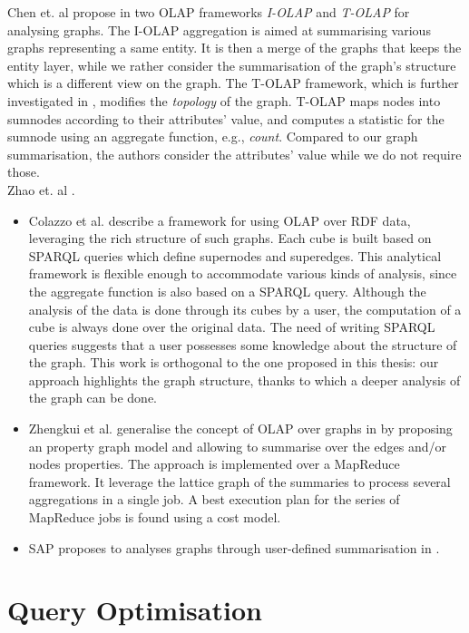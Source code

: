 Chen et. al propose in \cite{chen:icdm:2008} two OLAP frameworks \emph{I-OLAP} and \emph{T-OLAP} for analysing graphs. The I-OLAP aggregation is aimed at summarising various graphs representing a same entity. It is then a merge of the graphs that keeps the entity layer, while we rather consider the summarisation of the graph's structure which is a different view on the graph. The T-OLAP framework, which is further investigated in \cite{qu:dasfaa:2011}, modifies the \emph{topology} of the graph. T-OLAP maps nodes into sumnodes according to their attributes' value, and computes a statistic for the sumnode using an aggregate function, e.g., \emph{count}. Compared to our graph summarisation, the authors consider the attributes' value while we do not require those.\\

Zhao et. al \cite{zhao:sigmod:2011}.

\begin{itemize}
\item Colazzo et al. \cite{colazzo:www:2014} describe a framework for using OLAP over RDF data, leveraging the rich structure of such graphs. Each cube is built based on SPARQL queries which define supernodes and superedges. This analytical framework is flexible enough to accommodate various kinds of analysis, since the aggregate function is also based on a SPARQL query. Although the analysis of the data is done through its cubes by a user, the computation of a cube is always done over the original data. The need of writing SPARQL queries suggests that a user possesses some knowledge about the structure of the graph. This work is orthogonal to the one proposed in this thesis: our approach highlights the graph structure, thanks to which a deeper analysis of the graph can be done.
\item Zhengkui et al. generalise the concept of OLAP over graphs in \cite{zhengkui:2014:ppg} by proposing an property graph model and allowing to summarise over the edges and/or nodes properties. The approach is implemented over a MapReduce framework. It leverage the lattice graph of the summaries to process several aggregations in a single job. A best execution plan for the series of MapReduce jobs is found using a cost model.
\item SAP proposes to analyses graphs through user-defined summarisation in \cite{rudolf:2013:slg}.
\end{itemize}

\section{Query Optimisation}
\label{chap03:review:query-optim}


